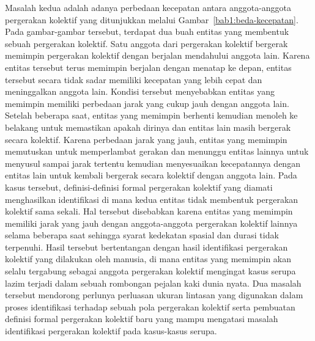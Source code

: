 Masalah kedua adalah adanya perbedaan kecepatan antara anggota-anggota pergerakan kolektif yang ditunjukkan melalui Gambar~\ref{bab1:beda-kecepatan}. Pada gambar-gambar tersebut, terdapat dua buah entitas yang membentuk sebuah pergerakan kolektif. Satu anggota dari pergerakan kolektif bergerak memimpin pergerakan kolektif dengan berjalan mendahului anggota lain. Karena entitas tersebut terus memimpin berjalan dengan menatap ke depan, entitas tersebut secara tidak sadar memiliki kecepatan yang lebih cepat dan meninggalkan anggota lain. Kondisi tersebut menyebabkan entitas yang memimpin memiliki perbedaan jarak yang cukup jauh dengan anggota lain. Setelah beberapa saat, entitas yang memimpin berhenti kemudian menoleh ke belakang untuk memastikan apakah dirinya dan entitas lain masih bergerak secara kolektif. Karena perbedaan jarak yang jauh, entitas yang memimpin memutuskan untuk memperlambat gerakan dan menunggu entitas lainnya untuk menyusul sampai jarak tertentu kemudian menyesuaikan kecepatannya dengan entitas lain untuk kembali bergerak secara kolektif dengan anggota lain. Pada kasus tersebut, definisi-definisi formal pergerakan kolektif yang diamati menghasilkan identifikasi di mana kedua entitas tidak membentuk pergerakan kolektif sama sekali. Hal tersebut disebabkan karena entitas yang memimpin memiliki jarak yang jauh dengan anggota-anggota pergerakan kolektif lainnya selama beberapa saat sehingga syarat kedekatan spasial dan durasi tidak terpenuhi. Hasil tersebut bertentangan dengan hasil identifikasi pergerakan kolektif yang dilakukan oleh manusia, di mana entitas yang memimpin akan selalu tergabung sebagai anggota pergerakan kolektif mengingat kasus serupa lazim terjadi dalam sebuah rombongan pejalan kaki dunia nyata. Dua masalah tersebut mendorong perlunya perluasan ukuran lintasan yang digunakan dalam proses identifikasi terhadap sebuah pola pergerakan kolektif serta pembuatan definisi formal pergerakan kolektif baru yang mampu mengatasi masalah identifikasi pergerakan kolektif pada kasus-kasus serupa. 

